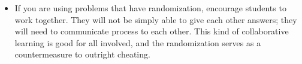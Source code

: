 \documentclass[12pt]{article}
\begin{document}
\begin{itemize}
	\item If you are using problems that have randomization, encourage students to work together.
	      They will not be simply able to give each other answers; they will need to communicate process to each other.
	      This kind of collaborative learning is good for all involved, and the randomization serves as a countermeasure to outright cheating.

\end{itemize}
\end{document}
